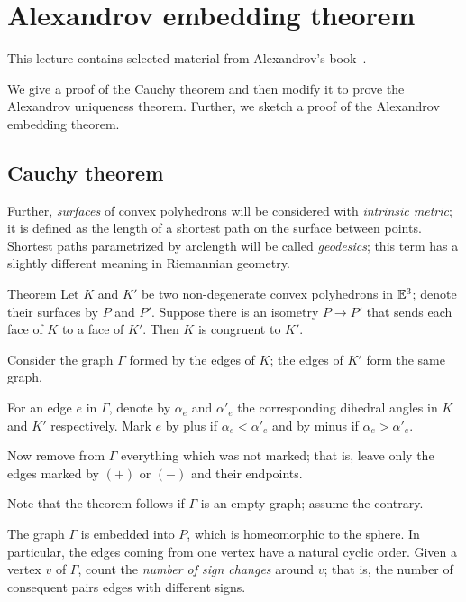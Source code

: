 \chapter{Alexandrov embedding theorem}

This lecture contains selected material from Alexandrov's book~\cite{alexandrov}.

We give a proof of the Cauchy theorem and then modify it to prove the Alexandrov uniqueness theorem.
Further, we sketch a proof of the Alexandrov embedding theorem.


\section{Cauchy theorem}

Further, \emph{surfaces} of convex polyhedrons will be considered with \emph{intrinsic metric}; it is defined as the length of a shortest path on the surface between points.
Shortest paths parametrized by arclength will be called \emph{geodesics}; 
this term has a slightly different meaning in Riemannian geometry.
 
\begin{thm}{Theorem}\label{thm:cauchy} Let $K$ and $K'$ be two non-degenerate convex polyhedrons in $\mathbb{E}^3$;
denote their surfaces 
by $P$ and $P'$.
Suppose there is an isometry $P\to P'$ that sends each face of $K$ to a face of $K'$.
Then $K$ is congruent to $K'$.
\end{thm}

Consider the graph $\Gamma$ formed by the edges of $K$;
the edges of $K'$ form the same graph.
 
For an edge $e$ in $\Gamma$, denote by $\alpha_e$ and $\alpha'_e$ the corresponding dihedral angles in $K$ and $K'$ respectively.
Mark $e$ by plus if $\alpha_e < \alpha'_e$ and by minus if $\alpha_e > \alpha'_e$.

Now remove from $\Gamma$ everything which was not marked;
that is, leave only the edges marked by $(+)$ or $(-)$ and their endpoints.

Note that the theorem follows if $\Gamma$ is an empty graph;
assume the contrary.

The graph $\Gamma$ is embedded into $P$, which is homeomorphic to the sphere.
In particular, the edges coming from one vertex have a natural cyclic order. 
Given a vertex $v$ of $\Gamma$, count the \emph{number of sign changes} around $v$;
that is, the number of consequent pairs edges with different signs. 

